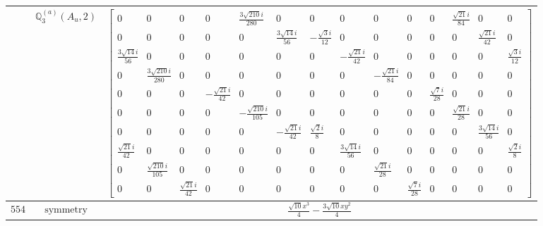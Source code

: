 \documentclass[fleqn,8pt,landscape]{jsarticle}
\begin{document}
\begin{longtable}{ccc}
$  $ & $ \mathbb{Q}_{3}^{(a)}(A_{u},2) $ & $ \begin{bmatrix} 0 & 0 & 0 & 0 & \frac{3 \sqrt{210} i}{280} & 0 & 0 & 0 & 0 & 0 & 0 & \frac{\sqrt{21} i}{84} & 0 & 0 \\ 0 & 0 & 0 & 0 & 0 & \frac{3 \sqrt{14} i}{56} & - \frac{\sqrt{3} i}{12} & 0 & 0 & 0 & 0 & 0 & \frac{\sqrt{21} i}{42} & 0 \\ \frac{3 \sqrt{14} i}{56} & 0 & 0 & 0 & 0 & 0 & 0 & - \frac{\sqrt{21} i}{42} & 0 & 0 & 0 & 0 & 0 & \frac{\sqrt{3} i}{12} \\ 0 & \frac{3 \sqrt{210} i}{280} & 0 & 0 & 0 & 0 & 0 & 0 & - \frac{\sqrt{21} i}{84} & 0 & 0 & 0 & 0 & 0 \\ 0 & 0 & 0 & - \frac{\sqrt{21} i}{42} & 0 & 0 & 0 & 0 & 0 & 0 & \frac{\sqrt{7} i}{28} & 0 & 0 & 0 \\ 0 & 0 & 0 & 0 & - \frac{\sqrt{210} i}{105} & 0 & 0 & 0 & 0 & 0 & 0 & \frac{\sqrt{21} i}{28} & 0 & 0 \\ 0 & 0 & 0 & 0 & 0 & - \frac{\sqrt{21} i}{42} & \frac{\sqrt{2} i}{8} & 0 & 0 & 0 & 0 & 0 & \frac{3 \sqrt{14} i}{56} & 0 \\ \frac{\sqrt{21} i}{42} & 0 & 0 & 0 & 0 & 0 & 0 & \frac{3 \sqrt{14} i}{56} & 0 & 0 & 0 & 0 & 0 & \frac{\sqrt{2} i}{8} \\ 0 & \frac{\sqrt{210} i}{105} & 0 & 0 & 0 & 0 & 0 & 0 & \frac{\sqrt{21} i}{28} & 0 & 0 & 0 & 0 & 0 \\ 0 & 0 & \frac{\sqrt{21} i}{42} & 0 & 0 & 0 & 0 & 0 & 0 & \frac{\sqrt{7} i}{28} & 0 & 0 & 0 & 0 \end{bmatrix} $ \\ \hline
$ 554 $ & $ \text{symmetry} $ & $ \frac{\sqrt{10} x^{3}}{4} - \frac{3 \sqrt{10} x y^{2}}{4} $ \\

\end{longtable}
\end{document}
